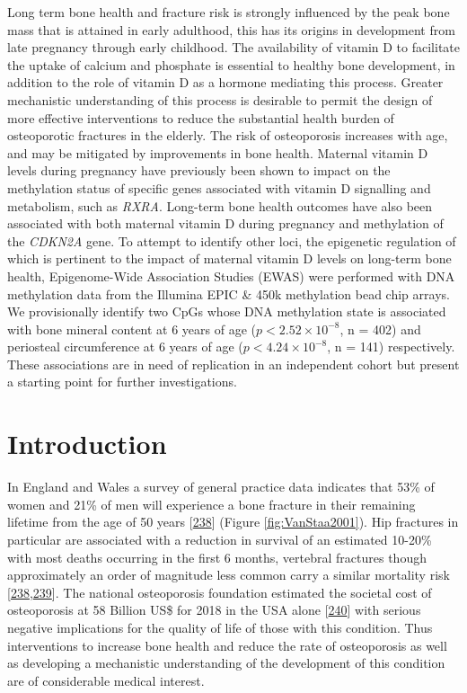 \documentclass[
]{book}
\begin{document}
Long term bone health and fracture risk is strongly influenced by the peak bone mass that is attained in early adulthood, this has its origins in development from late pregnancy through early childhood.
The availability of vitamin D to facilitate the uptake of calcium and phosphate is essential to healthy bone development, in addition to the role of vitamin D as a hormone mediating this process.
Greater mechanistic understanding of this process is desirable to permit the design of more effective interventions to reduce the substantial health burden of osteoporotic fractures in the elderly.
The risk of osteoporosis increases with age, and may be mitigated by improvements in bone health.
Maternal vitamin D levels during pregnancy have previously been shown to impact on the methylation status of specific genes associated with vitamin D signalling and metabolism, such as \emph{RXRA}.
Long-term bone health outcomes have also been associated with both maternal vitamin D during pregnancy and methylation of the \emph{CDKN2A} gene.
To attempt to identify other loci, the epigenetic regulation of which is pertinent to the impact of maternal vitamin D levels on long-term bone health, Epigenome-Wide Association Studies (EWAS) were performed with DNA methylation data from the Illumina EPIC \& 450k methylation bead chip arrays.
We provisionally identify two CpGs whose DNA methylation state is associated with bone mineral content at 6 years of age (\(p < 2.52\times 10^{-8}\), n = 402) and periosteal circumference at 6 years of age (\(p < 4.24\times 10^{-8}\), n = 141) respectively.
These associations are in need of replication in an independent cohort but present a starting point for further investigations.

\hypertarget{arrayIntro}{%
\section{Introduction}\label{arrayIntro}}

In England and Wales a survey of general practice data indicates that 53\% of women and 21\% of men will experience a bone fracture in their remaining lifetime from the age of 50 years {[}\protect\hyperlink{ref-VanStaa2001}{238}{]} (Figure \ref{fig:VanStaa2001}).
Hip fractures in particular are associated with a reduction in survival of an estimated 10-20\% with most deaths occurring in the first 6 months, vertebral fractures though approximately an order of magnitude less common carry a similar mortality risk {[}\protect\hyperlink{ref-VanStaa2001}{238},\protect\hyperlink{ref-Streubel2011}{239}{]}.
The national osteoporosis foundation estimated the societal cost of osteoporosis at 58 Billion US\$ for 2018 in the USA alone {[}\protect\hyperlink{ref-Thompson2018}{240}{]} with serious negative implications for the quality of life of those with this condition.
Thus interventions to increase bone health and reduce the rate of osteoporosis as well as developing a mechanistic understanding of the development of this condition are of considerable medical interest.
\end{document}

